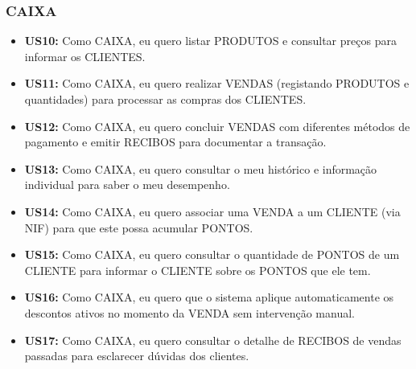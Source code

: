 \documentclass[a4paper]{llncs}
\begin{document}
\subsubsection{CAIXA}
\begin{itemize}
    \item \textbf{US10:} Como CAIXA, eu quero listar PRODUTOS e consultar preços para informar os CLIENTES.
    \item \textbf{US11:} Como CAIXA, eu quero realizar VENDAS (registando PRODUTOS e quantidades) para processar as compras dos CLIENTES.
    \item \textbf{US12:} Como CAIXA, eu quero concluir VENDAS com diferentes métodos de pagamento e emitir RECIBOS para documentar a transação.
    \item \textbf{US13:} Como CAIXA, eu quero consultar o meu histórico e informação individual para saber o meu desempenho.
    \item \textbf{US14:} Como CAIXA, eu quero associar uma VENDA a um CLIENTE (via NIF) para que este possa acumular PONTOS.
    \item \textbf{US15:} Como CAIXA, eu quero consultar o quantidade de PONTOS de um CLIENTE para informar o CLIENTE sobre os PONTOS que ele tem.
    \item \textbf{US16:} Como CAIXA, eu quero que o sistema aplique automaticamente os descontos ativos no momento da VENDA sem intervenção manual.
    \item \textbf{US17:} Como CAIXA, eu quero consultar o detalhe de RECIBOS de vendas passadas para esclarecer dúvidas dos clientes.
\end{itemize}
\end{document}
